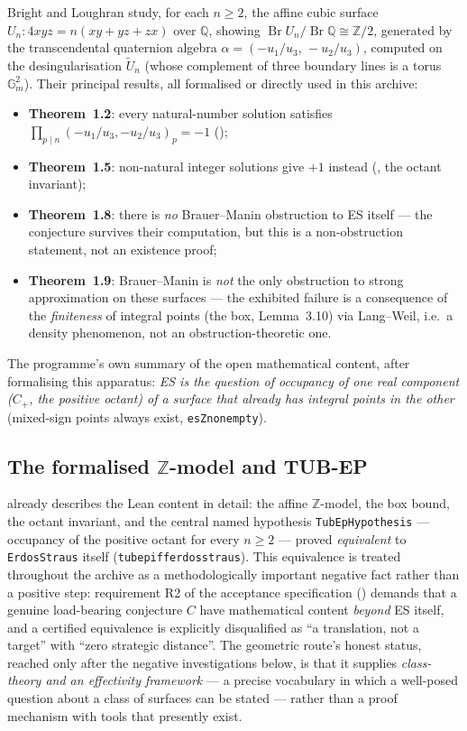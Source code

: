\documentclass[11pt]{article}
\theoremstyle{plain}
\theoremstyle{definition}
\theoremstyle{remark}
\newcommand{\lean}[1]{\texttt{#1}}
\renewcommand{\_}{\textunderscore\allowbreak}
\newcommand{\Z}{\mathbb{Z}}
\newcommand{\Q}{\mathbb{Q}}
\newcommand{\Br}{\operatorname{Br}}
\begin{document}
Bright and Loughran \cite{BrightLoughran2020} study, for each $n\ge2$, the affine cubic surface
$U_n:4xyz=n(xy+yz+zx)$ over $\Q$, showing $\Br U_n/\Br\Q\cong\Z/2$, generated by the
transcendental quaternion algebra $\alpha=(-u_1/u_3,\,-u_2/u_3)$, computed on the
desingularisation $\widetilde U_n$ (whose complement of three boundary lines is a torus
$\mathbb G_m^2$). Their principal results, all formalised or directly used in this archive:
\begin{itemize}[leftmargin=1.4em]
  \item \textbf{Theorem~1.2}: every natural-number solution satisfies
        $\prod_{p\mid n}(-u_1/u_3,-u_2/u_3)_p=-1$ ();
  \item \textbf{Theorem~1.5}: non-natural integer solutions give $+1$ instead
        (, the octant invariant);
  \item \textbf{Theorem~1.8}: there is \emph{no} Brauer--Manin obstruction to ES itself — the
        conjecture survives their computation, but this is a non-obstruction statement, not an
        existence proof;
  \item \textbf{Theorem~1.9}: Brauer--Manin is \emph{not} the only obstruction to strong
        approximation on these surfaces — the exhibited failure is a consequence of the
        \emph{finiteness} of integral points (the box, Lemma~3.10) via Lang--Weil, i.e.\ a
        density phenomenon, not an obstruction-theoretic one.
\end{itemize}
The programme's own summary of the open mathematical content, after formalising this apparatus:
\emph{ES is the question of occupancy of one real component ($C_+$, the positive octant) of a
surface that already has integral points in the other} (mixed-sign points always exist,
\lean{esZ\_nonempty}).

\subsection{The formalised $\Z$-model and TUB-EP}

 already describes the Lean content in detail: the affine $\Z$-model,
the box bound, the octant invariant, and the central named hypothesis
\lean{TubEpHypothesis} — occupancy of the positive octant for every $n\ge2$ — proved
\emph{equivalent} to \lean{ErdosStraus} itself (\lean{tub\_ep\_iff\_erdos\_straus}). This
equivalence is treated throughout the archive as a methodologically important negative fact
rather than a positive step: requirement R2 of the acceptance specification
() demands that a genuine load-bearing conjecture $C$ have mathematical content
\emph{beyond} ES itself, and a certified equivalence is explicitly disqualified as ``a
translation, not a target'' with ``zero strategic distance''. The geometric route's honest
status, reached only after the negative investigations below, is that it supplies
\emph{class-theory and an effectivity framework} — a precise vocabulary in which a well-posed
question about a class of surfaces can be stated — rather than a proof mechanism with tools that
presently exist.
\end{document}
